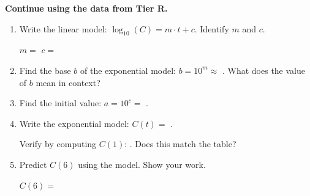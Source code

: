 \documentclass[10pt]{article}
\begin{document}
\vspace{0.1in}

\begin{tcolorbox}[colback=white, colframe=black!40,
    title=\textbf{Tier A --- Approaching Proficiency},
    fonttitle=\bfseries, arc=2mm, left=3mm, right=3mm, top=2mm, bottom=2mm]

\textbf{Continue using the data from Tier R.}

\begin{enumerate}[leftmargin=1.8em, itemsep=10pt]

\item Write the linear model: $\log_{10}(C) = m\cdot t + c$.  Identify $m$ and $c$.

\vspace{4pt}
$m = $  \qquad $c = $ 

\item Find the base $b$ of the exponential model: $b = 10^m \approx $ .
      What does the value of $b$ mean in context?


\item Find the initial value: $a = 10^c = $ .

\item Write the exponential model: $C(t) = $ .

      Verify by computing $C(1)$: . Does this match the table? 

\item Predict $C(6)$ using the model.  Show your work.

\vspace{4pt}
$C(6) = $ 

\end{enumerate}
\end{tcolorbox}

\vspace{0.1in}
\end{document}
